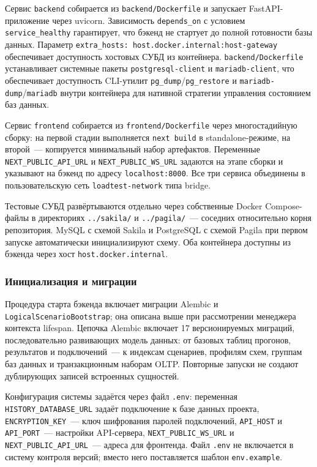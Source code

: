 Сервис \texttt{backend} собирается из \texttt{backend/Dockerfile} и запускает FastAPI-приложение через uvicorn. Зависимость \texttt{depends\_on} с условием \texttt{service\_healthy} гарантирует, что бэкенд не стартует до полной готовности базы данных. Параметр \texttt{extra\_hosts: host.docker.internal:host-gateway} обеспечивает доступность хостовых СУБД из контейнера. \texttt{backend/Dockerfile} устанавливает системные пакеты \texttt{postgresql-client} и \texttt{mariadb-client}, что обеспечивает доступность CLI-утилит \texttt{pg\_dump}/\texttt{pg\_restore} и \texttt{mariadb-dump}/\texttt{mariadb} внутри контейнера для нативной стратегии управления состоянием баз данных.

Сервис \texttt{frontend} собирается из \texttt{frontend/Dockerfile} через многостадийную сборку: на первой стадии выполняется \texttt{next build} в standalone-режиме, на второй~--- копируется минимальный набор артефактов. Переменные \texttt{NEXT\_PUBLIC\_API\_URL} и \texttt{NEXT\_PUBLIC\_WS\_URL} задаются на этапе сборки и указывают на бэкенд по адресу \texttt{localhost:8000}. Все три сервиса объединены в пользовательскую сеть \texttt{loadtest-network} типа bridge.

Тестовые СУБД развёртываются отдельно через собственные Docker Compose-файлы в директориях \texttt{../sakila/} и \texttt{../pagila/}~--- соседних относительно корня репозитория. MySQL с схемой Sakila и PostgreSQL с схемой Pagila при первом запуске автоматически инициализируют схему. Оба контейнера доступны из бэкенда через хост \texttt{host.docker.internal}.

\subsubsection{Инициализация и миграции}

Процедура старта бэкенда включает миграции Alembic и \texttt{LogicalScenarioBootstrap}; она описана выше при рассмотрении менеджера контекста lifespan. Цепочка Alembic включает 17 версионируемых миграций, последовательно развивающих модель данных: от базовых таблиц прогонов, результатов и подключений~--- к индексам сценариев, профилям схем, группам баз данных и транзакционным наборам OLTP. Повторные запуски не создают дублирующих записей встроенных сущностей.

Конфигурация системы задаётся через файл \texttt{.env}: переменная \texttt{HISTORY\_DATABASE\_URL} задаёт подключение к базе данных проекта, \texttt{ENCRYPTION\_KEY}~--- ключ шифрования паролей подключений, \texttt{API\_HOST} и \texttt{API\_PORT}~--- настройки API-сервера, \texttt{NEXT\_PUBLIC\_WS\_URL} и \texttt{NEXT\_PUBLIC\_API\_URL}~--- адреса для фронтенда. Файл \texttt{.env} не включается в систему контроля версий; вместо него поставляется шаблон \texttt{env.example}.

